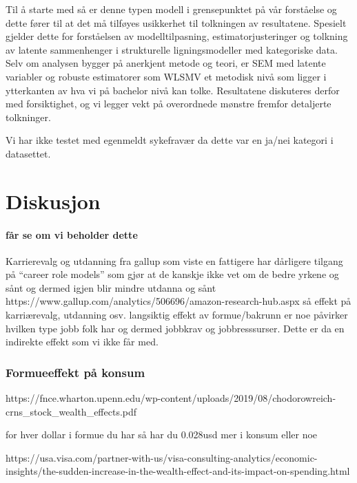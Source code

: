 \documentclass[
  12pt,
  a4paper,
  DIV=11,
  numbers=noendperiod]{scrartcl}
\let\oldparagraph\paragraph
\renewcommand{\paragraph}[1]{\oldparagraph{#1}\mbox{}}
\begin{document}
Til å starte med så er denne typen modell i grensepunktet på vår
forståelse og dette fører til at det må tilføyes usikkerhet til
tolkningen av resultatene. Spesielt gjelder dette for forståelsen av
modelltilpasning, estimatorjusteringer og tolkning av latente
sammenhenger i strukturelle ligningsmodeller med kategoriske data. Selv
om analysen bygger på anerkjent metode og teori, er SEM med latente
variabler og robuste estimatorer som WLSMV et metodisk nivå som ligger i
ytterkanten av hva vi på bachelor nivå kan tolke. Resultatene diskuteres
derfor med forsiktighet, og vi legger vekt på overordnede mønstre
fremfor detaljerte tolkninger.

Vi har ikke testet med egenmeldt sykefravær da dette var en ja/nei
kategori i datasettet.

\newpage

\section{Diskusjon}\label{diskusjon}

\paragraph{får se om vi beholder
dette}\label{fuxe5r-se-om-vi-beholder-dette}

Karrierevalg og utdanning fra gallup som viste en fattigere har
dårligere tilgang på ``career role models'' som gjør at de kanskje ikke
vet om de bedre yrkene og sånt og dermed igjen blir mindre utdanna og
sånt https://www.gallup.com/analytics/506696/amazon-research-hub.aspx så
effekt på karriærevalg, utdanning osv. langsiktig effekt av
formue/bakrunn er noe påvirker hvilken type jobb folk har og dermed
jobbkrav og jobbresssurser. Dette er da en indirekte effekt som vi ikke
får med.

\subsubsection{Formueeffekt på konsum}\label{formueeffekt-puxe5-konsum}

https://fnce.wharton.upenn.edu/wp-content/uploads/2019/08/chodorowreich-crns\_stock\_wealth\_effects.pdf

for hver dollar i formue du har så har du 0.028usd mer i konsum eller
noe

https://usa.visa.com/partner-with-us/visa-consulting-analytics/economic-insights/the-sudden-increase-in-the-wealth-effect-and-its-impact-on-spending.html
\end{document}
